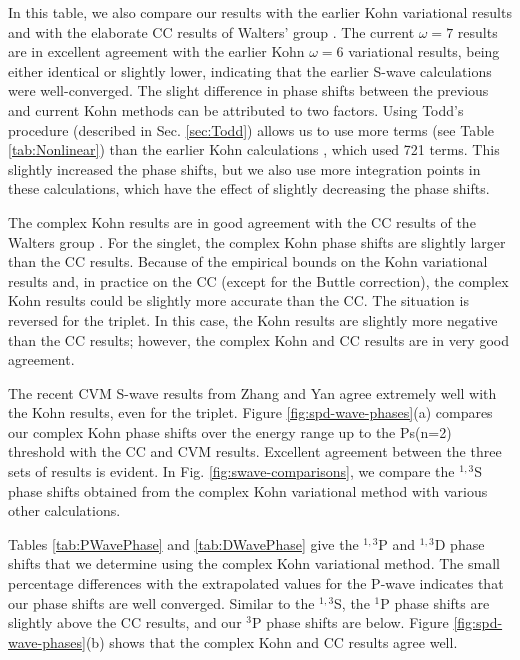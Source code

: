 \documentclass[reprint,showpacs,preprintnumbers,amsmath,amssymb,pra,aps]{revtex4-1}
\begin{document}
In this table, we also compare our results with the earlier Kohn variational results \cite{VanReeth2003,VanReeth2004} and with the elaborate CC results of Walters' group \cite{Blackwood2002,Walters2004}. The current $\omega = 7$ results are in excellent agreement with the earlier Kohn $\omega = 6$ variational results, being either identical or slightly lower, indicating that the earlier S-wave calculations were well-converged. The slight difference in phase shifts between the previous and current Kohn methods can be attributed to two factors. Using Todd's procedure (described in Sec. \ref{sec:Todd}) allows us to use more terms (see Table \ref{tab:Nonlinear}) than the earlier Kohn calculations \cite{VanReeth2003,VanReeth2004}, which used 721 terms. This slightly increased the phase shifts, but we also use more integration points in these calculations, which have the effect of slightly decreasing the phase shifts.

The complex Kohn results are in good agreement with the CC results of the Walters group \cite{Blackwood2002,Walters2004}. For the singlet, the complex Kohn phase shifts are slightly larger than the CC results. Because of the empirical bounds on the Kohn variational results and, in practice on the CC (except for the Buttle correction), the complex Kohn results could be slightly more accurate than the CC.
The situation is reversed for the triplet. In this case, the Kohn results are slightly more negative than the CC results; however, the complex Kohn and CC results are in very good agreement.

The recent CVM S-wave results from Zhang and Yan \cite{Zhang2012} agree extremely well with the Kohn results, even for the triplet. Figure \ref{fig:spd-wave-phases}(a) compares our complex Kohn phase shifts over the energy range up to the Ps(n=2) threshold with the CC and CVM results. Excellent agreement between the three sets of results is evident. In Fig. \ref{fig:swave-comparisons}, we compare the $^{1,3}$S phase shifts obtained from the complex Kohn variational method with various other calculations.

Tables \ref{tab:PWavePhase} and \ref{tab:DWavePhase} give the $^{1,3}$P and $^{1,3}$D phase shifts that we determine using the complex Kohn variational method. The small percentage differences with the extrapolated values for the P-wave indicates that our phase shifts are well converged. Similar to the $^{1,3}$S, the $^1$P phase shifts are slightly above the CC results, and our $^3$P phase shifts are below. Figure \ref{fig:spd-wave-phases}(b) shows that the complex Kohn and CC results agree well.
\end{document}
